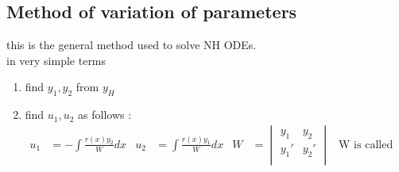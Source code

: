 \documentclass[11pt]{article}
\theoremstyle{definition}
\begin{document}
\subsection{Method of variation of parameters}
this is the general method used to solve NH ODEs.\\
in very simple terms 
\begin{enumerate}
    \item find $y_1, y_2$ from $y_H$
    \item find $u_1,u_2$ as follows :
    \begin{align*}
        u_1 &= -\int \frac{r(x) y_2}{W} dx & u_2 &= \int \frac{r(x) y_1}{W} dx&
        W &= \begin{vmatrix}
        y_1&y_2\\
        y_1'&y_2'\\
            \end{vmatrix}
           & \text{W is called the Wronskian}
    \end{align*}
\end{enumerate}
\end{document}
